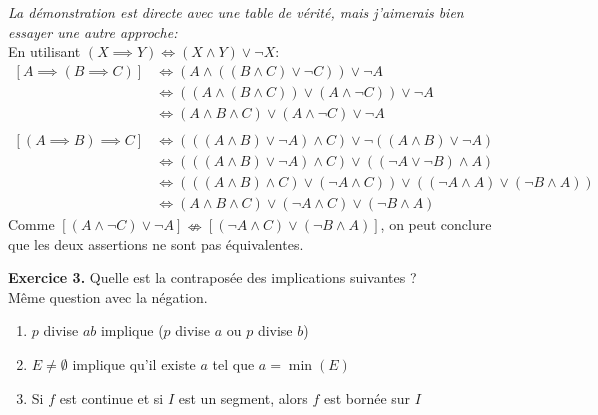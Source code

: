 \documentclass[a4paper, 10pt]{report}
\begin{document}
	\colorbox{solution}
	{
		\begin{minipage}{0.9\textwidth}
			\textit{\color{blue} La démonstration est directe avec une
				table de vérité, mais j'aimerais bien essayer une autre
				approche:}\\
			
			En utilisant $(X \implies Y) \iff (X \land Y) \lor \lnot X$:
			\[\begin{aligned}
				[A \implies (B \implies C)]
				&\iff (A \land ((B \land C) \lor \lnot C)) \lor \lnot A \\
				&\iff ((A \land (B \land C)) 
					\lor (A \land \lnot C)) \lor \lnot A \\
				&\iff (A \land B \land C) 
					\lor (A \land \lnot C) \lor \lnot A \\
				\\
				[(A \implies B) \implies C]
				&\iff (((A \land B) \lor \lnot A) \land C)
					\lor \lnot ((A \land B) \lor \lnot A) \\
				&\iff  (((A \land B) \lor \lnot A) \land C)
					\lor ((\lnot A \lor \lnot B) \land A) \\
				&\iff (((A \land B)\land C) \lor (\lnot A \land C))
					\lor ((\lnot A \land A) \lor (\lnot B \land A)) \\
				&\iff (A \land B\land C) \lor (\lnot A \land C)
					\lor (\lnot B \land A)
			\end{aligned}\]
		Comme $[(A \land \lnot C) \lor \lnot A]
			\nLeftrightarrow [(\lnot A \land C) \lor (\lnot B \land A)]$,
		on peut conclure que les deux assertions ne sont pas équivalentes.
		\end{minipage}
	}
		
	\vspace{5mm}
	\noindent
	\textbf{Exercice 3.} Quelle est la contraposée des implications
	suivantes ?\\
	Même question avec la négation.
	
	\begin{enumerate}[label=\arabic*.]
		\item $p$ divise $ab$ implique ($p$ divise $a$ ou $p$ divise $b$)
		\item $E \neq \emptyset$ implique qu'il existe $a$ tel que
		$a = \min(E)$
		\item Si $f$ est continue et si $I$ est un segment, alors $f$ est
		bornée sur $I$
	\end{enumerate}
	
\end{document}
